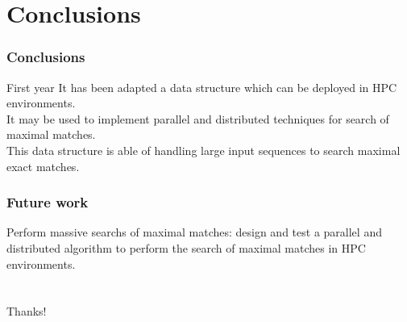 \documentclass{beamer}
\begin{document}
\section{Conclusions}
    \begin{frame}
    \frametitle{Conclusions}
    \begin{block}{First year}
It has been adapted a data structure which can be deployed in HPC environments.\\
It may be used to implement parallel and distributed techniques for search of maximal matches.\\
This data structure is able of handling large input sequences to search maximal exact matches.
\end{block}
\end{frame}
\begin{frame}
  \frametitle{Future work}
\begin{block}{}
Perform massive searchs of maximal matches: design and test a parallel and distributed algorithm to perform the search of maximal matches in HPC environments.
\end{block}
\end{frame}
\section{}
\begin{frame}
  \begin{center}
    \Huge{Thanks!}
\end{center}
\end{frame}
\begin{frame}
  \titlepage
\end{frame}
\end{document}

